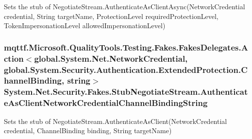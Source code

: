 Sets the stub of Negotiate\-Stream.\-Authenticate\-As\-Client\-Async(\-Network\-Credential credential, String target\-Name, Protection\-Level required\-Protection\-Level, Token\-Impersonation\-Level allowed\-Impersonation\-Level)

\hypertarget{class_system_1_1_net_1_1_security_1_1_fakes_1_1_stub_negotiate_stream_ab26db2409266ae7ca8f3534346bbc575}{
\subsubsection[{Authenticate\-As\-Client\-Network\-Credential\-Channel\-Binding\-String}]{\setlength{\rightskip}{0pt plus 5cm}mqttf.\-Microsoft.\-Quality\-Tools.\-Testing.\-Fakes.\-Fakes\-Delegates.\-Action$<$global.\-System.\-Net.\-Network\-Credential, global.\-System.\-Security.\-Authentication.\-Extended\-Protection.\-Channel\-Binding, string$>$ System.\-Net.\-Security.\-Fakes.\-Stub\-Negotiate\-Stream.\-Authenticate\-As\-Client\-Network\-Credential\-Channel\-Binding\-String}}\label{class_system_1_1_net_1_1_security_1_1_fakes_1_1_stub_negotiate_stream_ab26db2409266ae7ca8f3534346bbc575}


Sets the stub of Negotiate\-Stream.\-Authenticate\-As\-Client(\-Network\-Credential credential, Channel\-Binding binding, String target\-Name)

